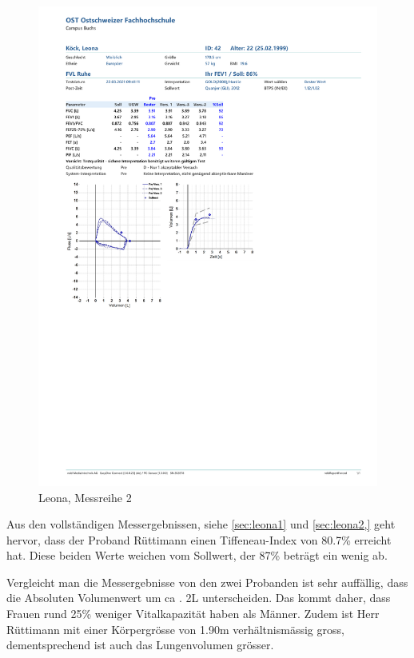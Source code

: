 \documentclass[11pt]{scrartcl}
\begin{document}
        \begin{figure}[H]
        \centering
        \includegraphics[clip, trim=1cm 10cm 0cm 10.6cm, width=15cm]{Dateien/Leona2.pdf}
        \caption{Leona, Messreihe 2}
        \end{figure}


    Aus den vollständigen Messergebnissen, siehe \autoref{sec:leona1} und \autoref{sec:leona2,} geht hervor, dass der
    Proband Rüttimann einen Tiffeneau-Index von 80.7\% erreicht hat.
    Diese beiden Werte weichen vom Sollwert, der 87\% beträgt ein wenig ab.

    Vergleicht man die Messergebnisse von den zwei Probanden ist sehr auffällig, dass die Absoluten Volumenwert um ca
    . 2L unterscheiden.
    Das kommt daher, dass Frauen rund 25\% weniger Vitalkapazität haben als Männer.
    Zudem ist Herr Rüttimann mit einer Körpergrösse von 1.90m verhältnismässig gross, dementsprechend ist auch das
    Lungenvolumen grösser.
\end{document}
